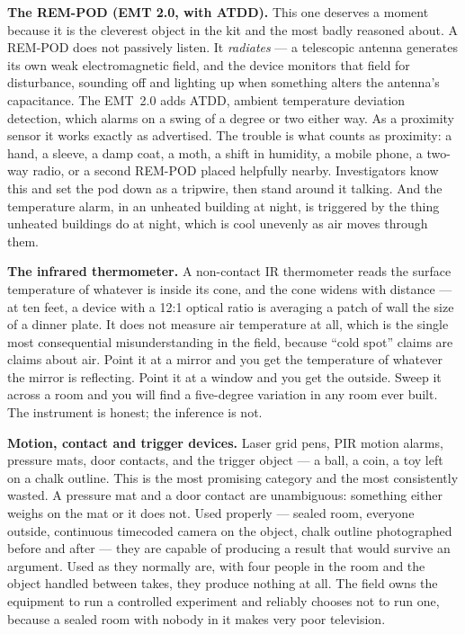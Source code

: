 \textbf{The REM-POD (EMT 2.0, with ATDD).} This one deserves a moment because it is the cleverest
object in the kit and the most badly reasoned about. A REM-POD does not passively listen. It
\emph{radiates} --- a telescopic antenna generates its own weak electromagnetic field, and the
device monitors that field for disturbance, sounding off and lighting up when something alters the
antenna's capacitance. The EMT~2.0 adds ATDD, ambient temperature deviation detection, which
alarms on a swing of a degree or two either way. As a proximity sensor it works exactly as
advertised. The trouble is what counts as proximity: a hand, a sleeve, a damp coat, a moth, a
shift in humidity, a mobile phone, a two-way radio, or a second REM-POD placed helpfully nearby.
Investigators know this and set the pod down as a tripwire, then stand around it talking. And the
temperature alarm, in an unheated building at night, is triggered by the thing unheated buildings
do at night, which is cool unevenly as air moves through them. 

\textbf{The infrared thermometer.} A non-contact IR thermometer reads the surface temperature of
whatever is inside its cone, and the cone widens with distance --- at ten feet, a device with a
12:1 optical ratio is averaging a patch of wall the size of a dinner plate. It does not measure air
temperature at all, which is the single most consequential misunderstanding in the field, because
``cold spot'' claims are claims about air. Point it at a mirror and you get the temperature of
whatever the mirror is reflecting. Point it at a window and you get the outside. Sweep it across
a room and you will find a five-degree variation in any room ever built. The instrument is honest;
the inference is not.

\textbf{Motion, contact and trigger devices.} Laser grid pens, PIR motion alarms, pressure mats,
door contacts, and the trigger object --- a ball, a coin, a toy left on a chalk outline. This is
the most promising category and the most consistently wasted. A pressure mat and a door contact
are unambiguous: something either weighs on the mat or it does not. Used properly --- sealed
room, everyone outside, continuous timecoded camera on the object, chalk outline photographed
before and after --- they are capable of producing a result that would survive an argument. Used
as they normally are, with four people in the room and the object handled between takes, they
produce nothing at all. The field owns the equipment to run a controlled experiment and reliably
chooses not to run one, because a sealed room with nobody in it makes very poor television.

